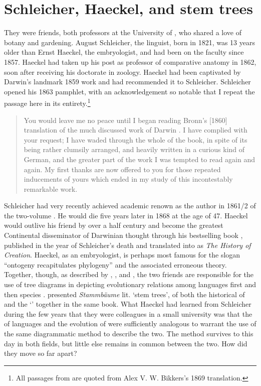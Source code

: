 \documentclass[output=paper,
modfonts
]{LSP/langsci}
\begin{document}
\section{Schleicher, Haeckel, and stem trees}

They were friends, both professors at the University of , who shared a love of botany and gardening.  August Schleicher, the linguist, born in 1821, was 13 years older than Ernst Haeckel, the embryologist, and had been on the faculty since 1857. Haeckel had taken up his post as professor of comparative anatomy in 1862, soon after receiving his doctorate in zoology. Haeckel had been captivated by Darwin's landmark 1859 work and had recommended it to Schleicher. Schleicher opened his 1863 pamphlet,  with an acknowledgement so notable that I repeat the passage here in its entirety.\footnote{All passages from \citet{Schleicher1863} are quoted from Alex V. W. Bikkers's 1869  translation.}

\begin{quote}
You would leave me no peace until I began reading Bronn's [1860] translation of the much discussed work of Darwin . I have complied with your request; I have waded through the whole of the book, in spite of its being rather clumsily arranged, and heavily written in a curious kind of German, and the greater part of the work I was tempted to read again and again. My first thanks are now offered to you for those repeated inducements of yours which ended in my study of this incontestably remarkable work. \citep[13--14]{schleicher1869}
\end{quote}

Schleicher had very recently achieved academic renown as the author in 1861/2 of the two-volume . He would die five years later in 1868 at the age of 47.  Haeckel would outlive his friend by over a half century and become the greatest Continental disseminator of Darwinian thought through his bestselling book , published in the year of Schleicher's death and translated into  as \textit{The History of Creation}. Haeckel, as an embryologist, is perhaps most famous for the slogan ``ontogeny recapitulates phylogeny'' and the associated erroneous theory. Together, though, as described by \citet{Burrow1972}, \citet{O'Hara1996}, and \citet{gontier2011}, the two friends are responsible for the use of tree diagrams in depicting evolutionary relations among languages first \citep{Schleicher1861,Schleicher1863} and then species \citep{Haeckel1866}. \citet{Haeckel1874} presented \textit{Stammbäume} lit. `stem trees’, of both the historical  of  and the ‘' together in the same book.  What Haeckel had learned from Schleicher during the few years that they were colleagues in a small university was that the  of languages and the evolution of  were sufficiently analogous to warrant the use of the same diagrammatic method to describe the two. The method survives to this day in both fields, but little else remains in common between the two.  How did they move so far apart?
\end{document}
